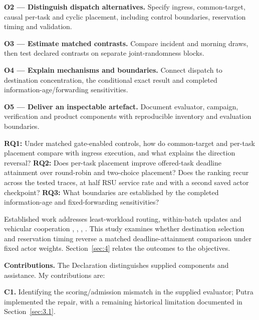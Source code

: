 \documentclass[12pt,a4paper]{article}
\begin{document}
\textbf{O2 --- Distinguish dispatch alternatives.} Specify ingress, common-target, causal per-task and cyclic placement, including control boundaries, reservation timing and validation.

\textbf{O3 --- Estimate matched contrasts.} Compare incident and morning draws, then test declared contrasts on separate joint-randomness blocks.

\textbf{O4 --- Explain mechanisms and boundaries.} Connect dispatch to destination concentration, the conditional exact result and completed information-age/forwarding sensitivities.

\textbf{O5 --- Deliver an inspectable artefact.} Document evaluator, campaign, verification and product components with reproducible inventory and evaluation boundaries.

\textbf{RQ1:} Under matched gate-enabled controls, how do common-target and per-task placement compare with ingress execution, and what explains the direction reversal? \textbf{RQ2:} Does per-task placement improve offered-task deadline attainment over round-robin and two-choice placement? Does the ranking recur across the tested traces, at half RSU service rate and with a second saved actor checkpoint? \textbf{RQ3:} What boundaries are established by the completed information-age and fixed-forwarding sensitivities?

Established work addresses least-workload routing, within-batch updates and vehicular cooperation \cite{ref7}, \cite{ref8}, \cite{ref14}, \cite{ref16}. This study examines whether destination selection and reservation timing reverse a matched deadline-attainment comparison under fixed actor weights. Section~\ref{sec:4} relates the outcomes to the objectives.

\textbf{Contributions.} The Declaration distinguishes supplied components and assistance. My contributions are:

\textbf{C1.} Identifying the scoring/admission mismatch in the supplied evaluator; Putra implemented the repair, with a remaining historical limitation documented in Section~\ref{sec:3.1}.
\end{document}
